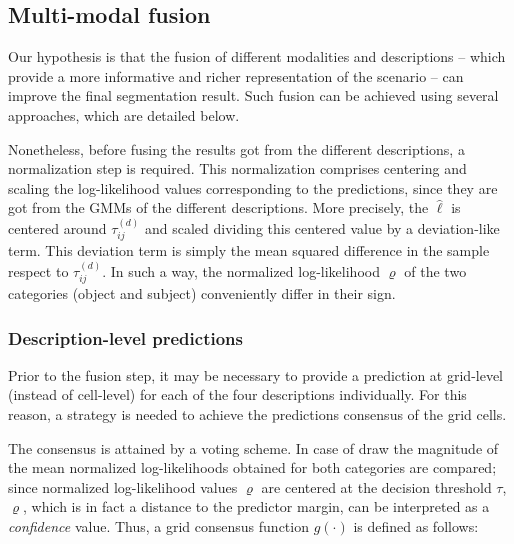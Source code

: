 \documentclass[10pt,twocolumn,letterpaper]{article}
\begin{document}
\subsection{Multi-modal fusion} 
\label{ssec:fusion}

Our hypothesis is that the fusion of different modalities and descriptions -- which provide a more informative and richer representation of the scenario -- can improve the final segmentation result. Such fusion can be achieved using several approaches, which are detailed below.
 
Nonetheless, before fusing the results got from the different descriptions, a normalization step is required. This normalization comprises centering and scaling the log-likelihood values corresponding to the predictions, since they are got from the GMMs of the different descriptions. More precisely, the $\hat{\ell}$ is centered around $\tau_{ij}^{(d)}$ and scaled dividing this centered value by a deviation-like term. This deviation term is simply the mean squared difference in the sample respect to $\tau_{ij}^{(d)}$. In such a way, the normalized log-likelihood $\varrho$ of the two categories (object and subject) conveniently differ in their sign.

\subsubsection{Description-level predictions}
\label{sssec:descriptionlevelpredictions}

Prior to the fusion step, it may be necessary to provide a prediction at grid-level (instead of cell-level) for each of the four descriptions individually. For this reason, a strategy is needed to achieve the predictions consensus of the grid cells. 

The consensus is attained by a voting scheme. In case of draw the magnitude of the mean normalized log-likelihoods obtained for both categories are compared; since normalized log-likelihood values $\varrho$ are centered at the decision threshold $\tau$, $\varrho$, which is in fact a distance to the predictor margin, can be interpreted as a \textit{confidence} value. Thus, a grid consensus function $g(\cdot)$ is defined as follows:
\end{document}
